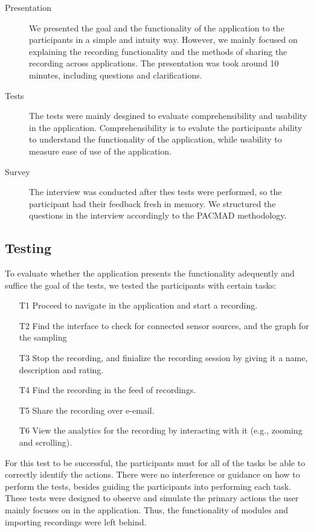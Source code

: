 \begin{description}
    \item[Presentation] We presented the goal and the functionality of the application to the participants in a simple and intuity way. However, we mainly focused on explaining the recording functionality and the methods of sharing the recording across applications. The presentation was took around 10 minutes, including questions and clarifications.  
    \item[Tests] The tests were mainly desgined to evaluate comprehensibility and usability in the application. Comprehensibility is to evalute the participants ability to understand the functionality of the application, while usability to measure ease of use of the application.
    \item[Survey] The interview was conducted after thes tests were performed, so the participant had their feedback fresh in memory. We structured the questions in the interview accordingly to the PACMAD methodology. 
\end{description}

\subsection{Testing}
To evaluate whether the application presents the functionality adequently and suffice the goal of the tests, we tested the participants with certain tasks:
\begin{itemize}
    \item[T1] Proceed to navigate in the application and start a recording.
    \item[T2] Find the interface to check for connected sensor sources, and the graph for the sampling
    \item[T3] Stop the recording, and finialize the recording session by giving it a name, description and rating.
    \item[T4] Find the recording in the feed of recordings. 
    \item[T5] Share the recording over e-email.
    \item[T6] View the analytics for the recording by interacting with it (e.g., zooming and scrolling). 
\end{itemize}

For this test to be successful, the participants must for all of the tasks be able to correctly identify the actions. There were no interference or guidance on how to perform the tests, besides guiding the participants into performing each task. These tests were designed to observe and simulate the primary actions the user mainly focuses on in the application. Thus, the functionality of modules and importing recordings were left behind. 


